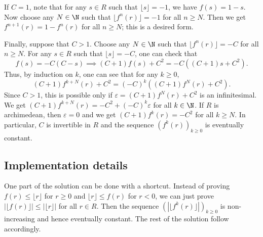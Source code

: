 If $C = 1$, note that for any $s \in R$ such that $\lfloor s \rfloor = -1$, we have $f(s) = 1 - s$.
Now choose any $N \in \N$ such that $\lfloor f^n(r) \rfloor = -1$ for all $n \geq N$.
Then we get $f^{n + 1}(r) = 1 - f^n(r)$ for all $n \geq N$; this is a desired form.

Finally, suppose that $C > 1$.
Choose any $N \in \N$ such that $\lfloor f^n(r) \rfloor = -C$ for all $n \geq N$.
For any $s \in R$ such that $\lfloor s \rfloor = -C$, one can check that
\[ f(s) = -C(C - s) \implies (C + 1) f(s) + C^2 = -C ((C + 1) s + C^2). \]
Thus, by induction on $k$, one can see that for any $k \geq 0$,
\[ (C + 1) f^{k + N}(r) + C^2 = (-C)^k ((C + 1) f^N(r) + C^2). \]
Since $C > 1$, this is possible only if $\varepsilon = (C + 1) f^N(r) + C^2$ is an infinitesimal.
We get $(C + 1) f^{k + N}(r) = -C^2 + (-C)^k \varepsilon$ for all $k \in \N$.
If $R$ is archimedean, then $\varepsilon = 0$ and we get $(C + 1) f^k(r) = -C^2$ for all $k \geq N$.
In particular, $C$ is invertible in $R$ and the sequence $(f^k(r))_{k \geq 0}$ is eventually constant.





\subsection*{Implementation details}

One part of the solution can be done with a shortcut.
Instead of proving $f(r) \leq \lfloor r \rfloor$ for $r \geq 0$ and $\lfloor r \rfloor \leq f(r)$ for $r < 0$, we can just prove $|\lfloor f(r) \rfloor| \leq |\lfloor r \rfloor|$ for all $r \in R$.
Then the sequence $(|\lfloor f^k(r) \rfloor|)_{k \geq 0}$ is non-increasing and hence eventually constant.
The rest of the solution follow accordingly.
